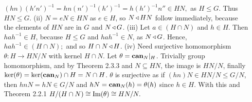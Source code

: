 $(hn)(h'n')^{-1} = hn(n')^{-1}(h')^{-1} = h(h')^{-1}n'' \in HN,$ as $H \le G$. Thus $HN \le G$. 
(ii) $N = eN \in HN$ as $e \in H$, so $N \operatorname{\triangleleft} HN$ follow immediately, because the elements of $HN$ are in $G$ and $N \operatorname{\triangleleft} G$.
(iii) Let $a \in (H \cap N)$ and $h \in H$. Then $hah^{-1} \in H$, because $H \le G$ and $hah^{-1} \in N$, as $N \operatorname{\triangleleft} G$. Hence, $hah^{-1} \in (H \cap N);$ and so $H \cap N \operatorname{\triangleleft} H$.
(iv) Need surjective homomorphism $\theta: H \to HN/N$ with kernel $H \cap N$. Let $\theta = \text{\textbf{can}}_N |_H$. Trivially group homomorphism, and by Theorem 2.3.3 and $N \subseteq HN$, the image is $HN/N$, finally $\ker(\theta) = \ker(\text{\textbf{can}}_N)\cap H = N \cap H$. $\theta$ is surjective as if $(hn)N \in HN/N \le G/N$, then $hnN = hN \in G/N$ and $hN = \text{\textbf{can}}_N(h) = \theta(h)$ since $h \in H$. With this and Theorem 2.2.1 $H/(H\cap N) \cong \text{Im}(\theta) \cong HN/N.$